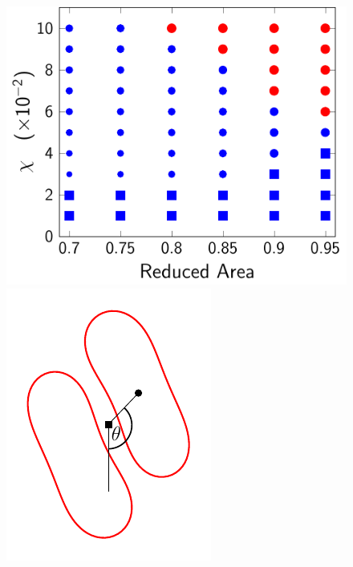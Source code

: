 \documentclass[prf,superscriptaddress,showpacs]{revtex4-1}
\begin{document}
\begin{figure}[htp]
  \begin{minipage}{0.6\textwidth}
    \centering
    \includegraphics[width=\textwidth]{figs/extensional_adR4em1adS7em1_phaseDiagram.pdf}
  \end{minipage}
  \hfill
  \begin{minipage}{0.33\textwidth}
    \centering
    \includegraphics[width=\textwidth]{figs/angleDefinition.pdf}

\end{minipage}
\end{figure}
\end{document}
